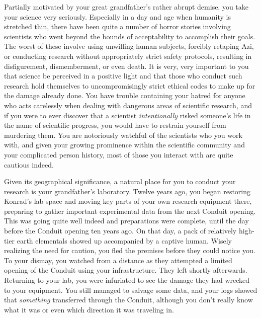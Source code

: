 \documentclass[char]{elementals}
\begin{document}
Partially motivated by your great grandfather's rather abrupt demise, you take your science very seriously. Especially in a day and age when humanity is stretched thin, there have been quite a number of horror stories involving scientists who went beyond the bounds of acceptability to accomplish their goals. The worst of these involve using unwilling human subjects, forcibly retaping Azi, or conducting research without appropriately strict safety protocols, resulting in disfigurement, dismemberment, or even death. It is very, very important to you that science be perceived in a positive light and that those who conduct such research hold themselves to uncompromisingly strict ethical codes to make up for the damage already done. You have trouble containing your hatred for anyone who acts carelessly when dealing with dangerous areas of scientific research, and if you were to ever discover that a scientist \emph{intentionally} risked someone's life in the name of scientific progress, you would have to restrain yourself from murdering them. You are notoriously watchful of the scientists who you work with, and given your growing prominence within the scientific community and your complicated person history, most of those you interact with are quite cautious indeed.



Given its geographical significance, a natural place for you to conduct your research is your grandfather's laboratory. Twelve years ago, you began restoring Konrad's lab space and moving key parts of your own research equipment there, preparing to gather important experimental data from the next Conduit opening. This was going quite well indeed and preparations were complete, until the day before the Conduit opening ten years ago. On that day, a pack of relatively high-tier earth elementals showed up accompanied by a captive human. Wisely realizing the need for caution, you fled the premises before they could notice you. To your dismay, you watched from a distance as they attempted a limited opening of the Conduit using your infrastructure. They left shortly afterwards. Returning to your lab, you were infuriated to see the damage they had wrecked to your equipment. You still managed to salvage some data, and your logs showed that \emph{something} transferred through the Conduit, although you don't really know what it was or even which direction it was traveling in.
\end{document}
